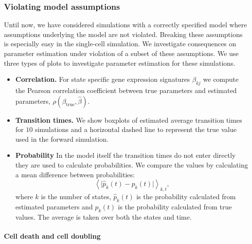 \subsubsection{Violating model assumptions}
\label{sec:viol-model-assumpt}

Until now, we have considered simulations with a correctly specified model where assumptions underlying the model are not violated. Breaking these assumptions is especially easy in the single-cell simulation. We investigate consequences on parameter estimation under violation of a subset of these assumptions. We use three types of plots to investigate parameter estimation for these simulations.

\begin{itemize}
\item {\bf Correlation.} For state specific gene expression signatures $\beta_{kj}$ we compute the Pearson correlation coefficient between true parameters and estimated parameters, $\rho(\beta_{\mathrm{true}},\hat{\beta})$.
\item {\bf Transition times.} We show boxplots of estimated average transition times for $10$ simulations and a horizontal dashed line to represent the true value used in the forward simulation.
\item {\bf Probability} In the model itself the transition times do not enter directly they are used to calculate probabilities. We compare the values by calculating a mean difference between probabilities:
\begin{equation}
  \label{eq:1}
  \left< \lvert \hat{p}_k(t) - p_k(t) \rvert \right>_{k,t},
\end{equation}
where $k$ is the number of states, $\hat{p}_k(t)$ is the probability calculated from estimated parameters and $p_k(t)$ is
the probability calculated from true values. The average is taken over both the states and time.
\end{itemize}



\paragraph{Cell death and cell doubling}
\label{sec:death-duplication}

